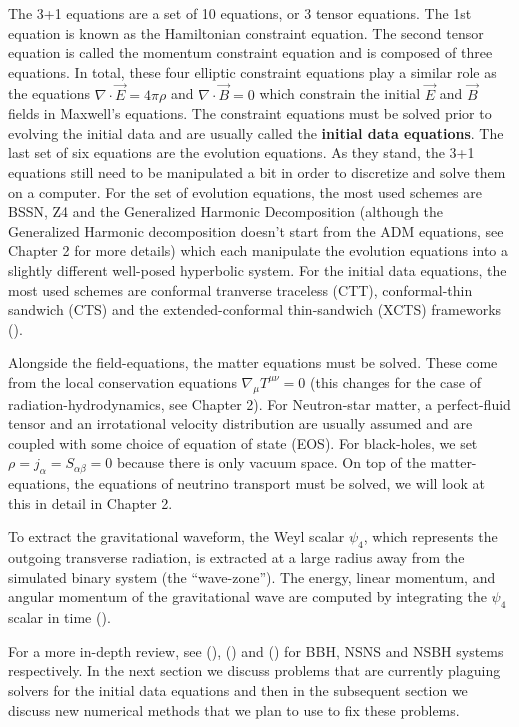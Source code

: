 The 3+1 equations are a set of 10 equations, or 3 tensor equations. The 1st equation is known as the Hamiltonian constraint equation. The second tensor equation is called the momentum constraint equation and is composed of three equations. In total, these four elliptic constraint equations play a similar role as the equations $\nabla \cdot \vec E = 4\pi\rho$ and $\nabla \cdot \vec B = 0$ which constrain the initial $\vec E$ and $\vec B$ fields in Maxwell's equations. The constraint equations must be solved prior to evolving the initial data and are usually called the \textbf{initial data equations}. The last set of six equations are the evolution equations. As they stand, the 3+1 equations still need to be manipulated a bit in order to discretize and solve them on a computer. For the set of evolution equations, the most used schemes are BSSN, Z4 and the Generalized Harmonic Decomposition (although the Generalized Harmonic decomposition doesn't start from the ADM equations, see Chapter 2 for more details) which each manipulate the evolution equations into a slightly different well-posed hyperbolic system. For the initial data equations, the most used schemes are conformal tranverse traceless (CTT), conformal-thin sandwich (CTS) and the extended-conformal thin-sandwich (XCTS) frameworks (\cite{pfeiffer-york:2005,alcubierre2012introduction,sopuerta2015gravitational}).

Alongside the field-equations, the matter equations must be solved. These come from the local conservation equations $\nabla_{\mu}T^{\mu\nu} = 0$ (this changes for the case of radiation-hydrodynamics, see Chapter 2). For Neutron-star matter, a perfect-fluid tensor and an irrotational velocity distribution are usually assumed and are coupled with some choice of equation of state (EOS). For black-holes, we set $\rho = j_{\alpha} = S_{\alpha\beta} = 0$ because there is only vacuum space. On top of the matter-equations, the equations of neutrino transport must be solved, we will look at this in detail in Chapter 2.

To extract the gravitational waveform, the Weyl scalar $\psi_{4}$, which represents the outgoing transverse radiation, is extracted at a large radius away from the simulated binary system (the ``wave-zone''). The energy, linear momentum, and angular momentum of the gravitational wave are computed by integrating the $\psi_{4}$ scalar in time (\cite{kyutoku2015dynamical}).

For a more in-depth review, see (\cite{sperhake2014numerical}), (\cite{faber2012binary}) and (\cite{shibata2011coalescence}) for BBH, NSNS and NSBH systems respectively. In the next section we discuss problems that are currently plaguing solvers for the initial data equations and then in the subsequent section we discuss new numerical methods that we plan to use to fix these problems.

